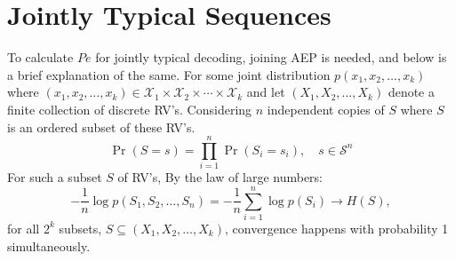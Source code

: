 
\section{Jointly Typical Sequences}
To calculate $Pe$ for jointly typical decoding, joining AEP is needed, and below is a brief explanation of the same.
For some joint distribution \( p(x_1, x_2, \ldots, x_k) \) where \((x_1, x_2, \ldots, x_k) \in \mathcal{X}_1 \times \mathcal{X}_2 \times \cdots \times \mathcal{X}_k\)  and let \((X_1, X_2, \ldots, X_k)\) denote a finite collection of discrete RV's.
Considering \(n\) independent copies of \(S\) where \(S\) is an ordered subset of these RV's.
\begin{equation}
    \Pr(S = s) = \prod_{i=1}^{n} \Pr(S_i = s_i), \quad s \in \mathcal{S}^n
\end{equation}
For such a subset \(S\) of RV's, By the law of large numbers:
\begin{equation}
    -\frac{1}{n} \log p(S_1, S_2, \ldots, S_n) = -\frac{1}{n} \sum_{i=1}^{n} \log p(S_i) \rightarrow H(S),
\end{equation}
for all \(2^k\) subsets, \(S \subseteq (X_1, X_2, \ldots, X_k)\), convergence happens  with probability 1 simultaneously.

